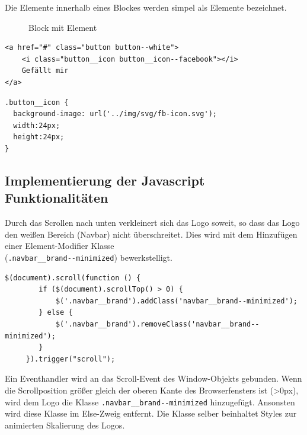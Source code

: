 Die Elemente innerhalb eines Blockes werden simpel als Elemente bezeichnet.

\begin{figure}[ht]
\caption{Block mit Element}
\end{figure}

\begin{lstlisting}[style=htmlcssjs, backgroundcolor = \color{lightgray},
caption=BEM -- Block mit Element (HTML)]
<a href="#" class="button button--white">
	<i class="button__icon button__icon--facebook"></i>
	Gefällt mir
</a>
\end{lstlisting}

\begin{lstlisting}[style=htmlcssjs, backgroundcolor = \color{lightgray},
caption=BEM -- Element (CSS)]
.button__icon {
  background-image: url('../img/svg/fb-icon.svg');
  width:24px;
  height:24px;
}
\end{lstlisting}


\subsection{Implementierung der Javascript Funktionalitäten}
\label{sec:ImplementierungJS}
Durch das Scrollen nach unten verkleinert sich das Logo soweit, so dass das
Logo  den weißen Bereich (Navbar) nicht überschreitet. Dies wird mit dem
Hinzufügen einer Element-Modifier Klasse \\
(\lstinline{.navbar__brand--minimized}) bewerkstelligt.
\\
\begin{lstlisting}[style=htmlcssjs, backgroundcolor = \color{lightgray},
caption=Logominimierung beim Scrollen]
    $(document).scroll(function () {
        if ($(document).scrollTop() > 0) {
            $('.navbar__brand').addClass('navbar__brand--minimized');
        } else {
            $('.navbar__brand').removeClass('navbar__brand--minimized');
        }
     }).trigger("scroll");     
\end{lstlisting}

Ein Eventhandler wird an das Scroll-Event des Window-Objekts gebunden.
Wenn die Scrollposition größer gleich der oberen Kante des Browserfensters ist
(>0px), wird dem Logo die Klasse \lstinline{.navbar__brand--minimized}
hinzugefügt. Ansonsten wird diese Klasse im Else-Zweig entfernt.
Die Klasse selber beinhaltet Styles zur animierten Skalierung des Logos.

